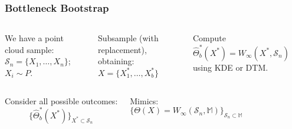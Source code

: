 \begin{frame}
    \frametitle{Bottleneck Bootstrap}

    \begin{columns}

        \begin{block}{}
            We have a point cloud sample: $\mathcal{S}_n = \{ X_1, \ldots, X_n\}$; $X_i \sim P$.
        \end{block}

        \pause

        \begin{block}{}
            Subsample (with replacement), obtaining:
            $X = \{ X_1^*, \ldots, X_b^*\}$
        \end{block}

        \pause

        \begin{block}{}
            Compute
            $\hat{\Theta}_b^*(X^*) =
            W_{\infty}(X^*,\mathcal{S}_n)$ using KDE or DTM.
        \end{block}

        \begin{block}{}
        \centering
        \end{block}

    \end{columns}

    \pause
    \begin{columns}
        \begin{block}{}
            Consider all possible outcomes:
            $$ \{ \hat{\Theta}_{b}^*(X^*) \}_{X^* \subset \mathcal{S}_n}$$
        \end{block}

        \pause
        \begin{block}{}
            Mimics:
            $$ \{ {\Theta}(X) = W_{\infty}(\mathcal{S}_n,\mathbb{M}) \}_{\mathcal{S}_n
            \subset \mathbb{M}}$$
        \end{block}
    \end{columns}
\end{frame}



